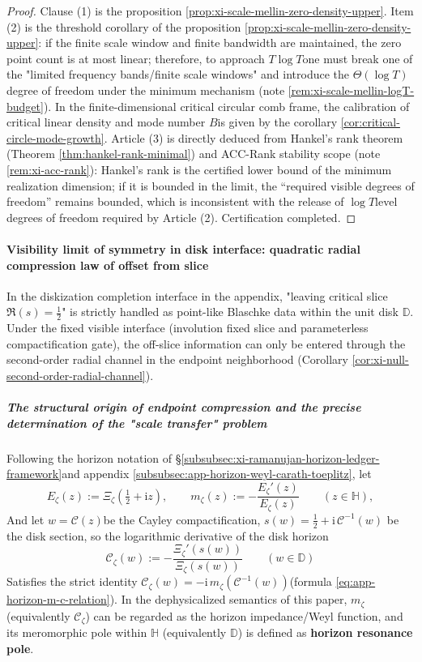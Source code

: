 \begin{proof}
Clause (1) is the proposition \ref{prop:xi-scale-mellin-zero-density-upper}.
Item (2) is the threshold corollary of the proposition \ref{prop:xi-scale-mellin-zero-density-upper}: if the finite scale window and finite bandwidth are maintained, the zero point count is at most linear; therefore, to approach \(T\log T\) ​​one must break one of the "limited frequency bands/finite scale windows" and introduce the \(\Theta(\log T)\) degree of freedom under the minimum mechanism (note \ref{rem:xi-scale-mellin-logT-budget}).
In the finite-dimensional critical circular comb frame, the calibration of critical linear density and mode number \(B\) ​​is given by the corollary \ref{cor:critical-circle-mode-growth}.
Article (3) is directly deduced from Hankel’s rank theorem (Theorem \ref{thm:hankel-rank-minimal}) and ACC-Rank stability scope (note \ref{rem:xi-acc-rank}): Hankel’s rank is the certified lower bound of the minimum realization dimension; if it is bounded in the limit, the “required visible degrees of freedom” remains bounded, which is inconsistent with the release of \(\log T\) ​​level degrees of freedom required by Article (2). Certification completed.
\end{proof}

\paragraph{Visibility limit of symmetry in disk interface: quadratic radial compression law of offset from slice}
In the diskization completion interface in the appendix, "leaving critical slice \(\Re(s)=\tfrac12\)" is strictly handled as point-like Blaschke data within the unit disk \(\mathbb{D}\).
Under the fixed visible interface (involution fixed slice and parameterless compactification gate), the off-slice information can only be entered through the second-order radial channel in the endpoint neighborhood (Corollary \ref{cor:xi-null-second-order-radial-channel}).

\subparagraph{The structural origin of endpoint compression and the precise determination of the "scale transfer" problem}
Following the horizon notation of \S\ref{subsubsec:xi-ramanujan-horizon-ledger-framework} ​​and appendix \ref{subsubsec:app-horizon-weyl-carath-toeplitz}, let
\[
E_{\zeta}(z):=\Xi_{\zeta}\!\left(\tfrac12+\mathrm{i}z\right),\qquad
m_{\zeta}(z):=-\frac{E_{\zeta}'(z)}{E_{\zeta}(z)}\qquad(z\in\mathbb{H}),
\]
And let \(w=\mathcal{C}(z)\) ​​be the Cayley compactification, \(s(w)=\tfrac12+\mathrm{i}\,\mathcal{C}^{-1}(w)\) be the disk section, so the logarithmic derivative of the disk horizon
\[
\mathscr{C}_{\zeta}(w):=-\frac{\Xi_{\zeta}'(s(w))}{\Xi_{\zeta}(s(w))}\qquad(w\in\mathbb{D})
\]
Satisfies the strict identity \(\mathscr{C}_{\zeta}(w)=-\mathrm{i}\,m_{\zeta}(\mathcal{C}^{-1}(w))\) ​​(formula \eqref{eq:app-horizon-m-c-relation}).
In the dephysicalized semantics of this paper, \(m_{\zeta}\) ​​(equivalently \(\mathscr{C}_{\zeta}\)) can be regarded as the horizon impedance/Weyl function, and its meromorphic pole within \(\mathbb{H}\) (equivalently \(\mathbb{D}\)) is defined as \textbf{horizon resonance pole}.

